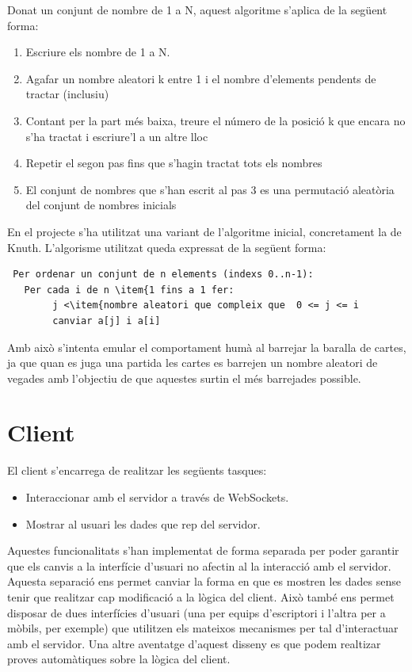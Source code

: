 Donat un conjunt de nombre de 1 a N, aquest algoritme s'aplica de la següent forma: 
\begin{enumerate}
\item{Escriure els nombre de 1 a N.}
\item{Agafar un nombre aleatori k entre 1 i el nombre d'elements pendents de tractar (inclusiu)}
\item{Contant per la part més baixa, treure el número de la posició k que encara no s'ha tractat i escriure'l a un altre lloc}
\item{Repetir el segon pas fins que s'hagin tractat tots els nombres}
\item{El conjunt de nombres que s'han escrit al pas 3 es una permutació aleatòria del conjunt de nombres inicials}
\end{enumerate}

En el projecte s'ha utilitzat una variant de l'algoritme inicial, concretament la de Knuth. L'algorisme utilitzat queda expressat de la següent forma: 

\begin{lstlisting}
 Per ordenar un conjunt de n elements (indexs 0..n-1):
   Per cada i de n \item{1 fins a 1 fer:
        j <\item{nombre aleatori que compleix que  0 <= j <= i
        canviar a[j] i a[i]
\end{lstlisting}

Amb això s'intenta emular el comportament humà al barrejar la baralla de cartes, ja que quan es juga una partida les cartes es barrejen un nombre aleatori de vegades amb l'objectiu de que aquestes surtin el més barrejades possible. 

\section{Client}

El client s'encarrega de realitzar les següents tasques: 

\begin{itemize}
\item{Interaccionar amb el servidor a través de WebSockets.}
\item{Mostrar al usuari les dades que rep del servidor.}
\end{itemize}

Aquestes funcionalitats s'han implementat de forma separada per poder garantir que els canvis a la interfície d'usuari no afectin al la interacció amb el servidor. Aquesta separació ens permet canviar la forma en que es mostren les dades sense tenir que realitzar cap modificació a la lògica del client. Això també ens permet disposar de dues interfícies d'usuari (una per equips d'escriptori i l'altra per a mòbils, per exemple) que utilitzen els mateixos mecanismes per tal d'interactuar amb el servidor. Una altre aventatge d'aquest disseny es que podem realtizar proves automàtiques sobre la lògica del client.

